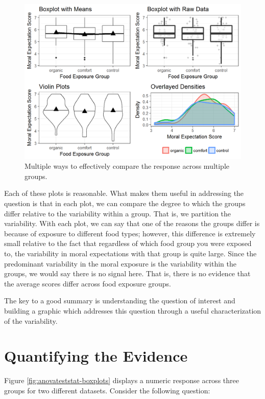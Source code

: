 \documentclass[]{book}
\theoremstyle{definition}
\theoremstyle{definition}
\theoremstyle{remark}
\begin{document}
\begin{figure}

{\centering \includegraphics[width=0.8\linewidth]{./Images/anovasummaries-organic-comparison-1} 

}

\caption{Multiple ways to effectively compare the response across multiple groups.}\label{fig:anovasummaries-organic-comparison}
\end{figure}

Each of these plots is reasonable. What makes them useful in addressing
the question is that in each plot, we can compare the degree to which
the groups differ relative to the variability within a group. That is,
we partition the variability. With each plot, we can say that one of the
reasons the groups differ is because of exposure to different food
types; however, this difference is extremely small relative to the fact
that regardless of which food group you were exposed to, the variability
in moral expectations with that group is quite large. Since the
predominant variability in the moral exposure is the variability within
the groups, we would say there is no signal here. That is, there is no
evidence that the average scores differ across food exposure groups.

The key to a good summary is understanding the question of interest and
building a graphic which addresses this question through a useful
characterization of the variability.

\chapter{Quantifying the Evidence}\label{ANOVAteststat}

Figure \ref{fig:anovateststat-boxplots} displays a numeric response
across three groups for two different datasets. Consider the following
question:
\end{document}
